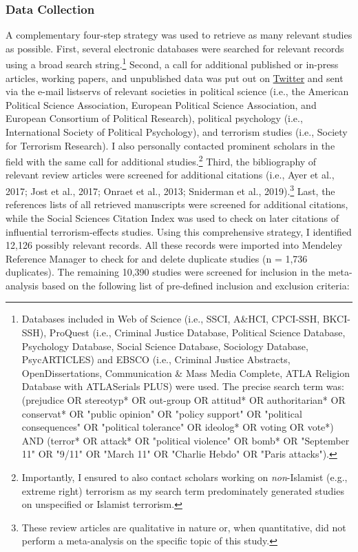 \subsubsection{Data Collection}
A complementary four-step strategy was used to retrieve as many relevant studies as possible. First, several electronic databases were searched for relevant records using a broad search string.\footnote{Databases included in Web of Science (i.e., SSCI, A\&HCI, CPCI-SSH, BKCI-SSH), ProQuest (i.e., Criminal Justice Database, Political Science Database, Psychology Database, Social Science Database, Sociology Database, PsycARTICLES) and EBSCO (i.e., Criminal Justice Abstracts, OpenDissertations, Communication \& Mass Media Complete, ATLA Religion Database with ATLASerials PLUS) were used. The precise search term was: (prejudice OR stereotyp* OR out-group OR attitud* OR authoritarian* OR conservat* OR "public opinion" OR "policy support" OR "political consequences" OR "political tolerance" OR ideolog* OR voting OR vote*) AND (terror* OR attack* OR "political violence" OR bomb* OR "September 11" OR "9/11" OR "March 11" OR "Charlie Hebdo" OR "Paris attacks").} Second, a call for additional published or in-press articles, working papers, and unpublished data was put out on \href{https://twitter.com/AGodefroidt/status/1222913211512561665}{Twitter} and sent via the e-mail listservs of relevant societies in political science (i.e., the American Political Science Association, European Political Science Association, and European Consortium of Political Research), political psychology (i.e., International Society of Political Psychology), and terrorism studies (i.e., Society for Terrorism Research). I also personally contacted prominent scholars in the field with the same call for additional studies.\footnote{Importantly, I ensured to also contact scholars working on \textit{non}-Islamist (e.g., extreme right) terrorism as my search term predominately generated studies on unspecified or Islamist terrorism.} Third, the bibliography of relevant review articles were screened for additional citations (i.e., Ayer et al., 2017; Jost et al., 2017; Onraet et al., 2013; Sniderman et al., 2019).\footnote{These review articles are qualitative in nature or, when quantitative, did not perform a meta-analysis on the specific topic of this study.} Last, the references lists of all retrieved manuscripts were screened for additional citations, while the Social Sciences Citation Index was used to check on later citations of influential terrorism-effects studies. Using this comprehensive strategy, I identified 12,126 possibly relevant records. All these records were imported into Mendeley Reference Manager to check for and delete duplicate studies (n = 1,736 duplicates). The remaining 10,390 studies were screened for inclusion in the meta-analysis based on the following list of pre-defined inclusion and exclusion criteria:


